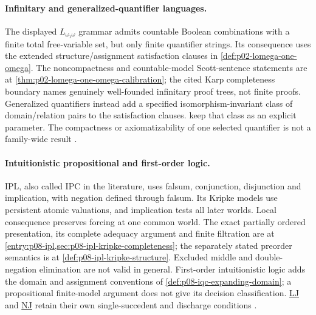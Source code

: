 \paragraph{Infinitary and generalized-quantifier languages.}
\label{entry:p14-directory-infinitary}
The displayed \(L_{\omega_1\omega}\) grammar admits countable Boolean
combinations with a finite total free-variable set, but only finite
quantifier strings. Its consequence uses the extended structure/assignment
satisfaction clauses in \cref{def:p02-lomega-one-omega}.
The noncompactness and countable-model Scott-sentence statements are at
\cref{thm:p02-lomega-one-omega-calibration}; the cited Karp completeness
boundary names genuinely well-founded infinitary proof trees, not finite
proofs. Generalized quantifiers instead add a specified isomorphism-invariant
class of domain/relation pairs to the satisfaction clauses.
keep that class as an explicit parameter. The compactness or
axiomatizability of one selected quantifier is not a family-wide result
\cite{Karp1964,Scott1965,Mostowski1957,Lindstrom1966,Keisler1970}.

\paragraph{Intuitionistic propositional and first-order logic.}
\label{entry:p14-directory-intuitionistic}
IPL, also called IPC in the literature, uses falsum, conjunction,
disjunction and implication, with negation defined through falsum.
Its Kripke models use persistent atomic valuations, and implication tests
all later worlds. Local consequence preserves forcing at one common
world. The exact partially ordered presentation, its complete adequacy
argument and finite filtration are at
\cref{entry:p08-ipl,sec:p08-ipl-kripke-completeness}; the separately stated
preorder semantics is at \cref{def:p08-ipl-kripke-structure}.
Excluded middle and double-negation elimination are not valid in general.
First-order intuitionistic logic adds the domain and assignment conventions
of \cref{def:p08-iqc-expanding-domain}; a propositional finite-model argument does not
give its decision classification. \hyperref[sheet:lj]{LJ} and
\hyperref[sheet:nj]{NJ} retain their own single-succedent and discharge
conditions \cite{Kripke1965,TroelstraVanDalen1988,TroelstraSchwichtenberg2000}.

